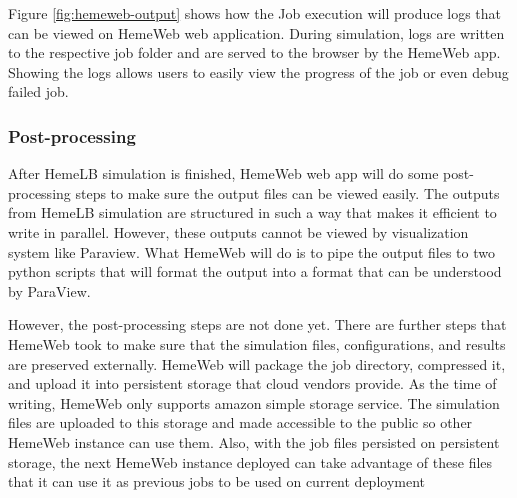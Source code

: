 \vspace{1cm}

\noindent%
\begin{minipage}{\linewidth}%
\label{fig:hemeweb-output}%
\end{minipage}

\vspace{1cm}

Figure \ref{fig:hemeweb-output} shows how the Job execution will produce logs that can be viewed on HemeWeb web application. During simulation, logs are written to the respective job folder and are served to the browser by the HemeWeb app. Showing the logs allows users to easily view the progress of the job or even debug failed job.


\subsubsection{Post-processing}

After HemeLB simulation is finished, HemeWeb web app will do some post-processing steps to make sure the output files can be viewed easily. The outputs from HemeLB simulation are structured in such a way that makes it efficient to write in parallel. However, these outputs cannot be viewed by visualization system like Paraview. What HemeWeb will do is to pipe the output files to two python scripts that will format the output into a format that can be understood by ParaView.


However, the post-processing steps are not done yet. There are further steps that HemeWeb took to make sure that the simulation files, configurations, and results are preserved externally. HemeWeb will package the job directory, compressed it, and upload it into persistent storage that cloud vendors provide. As the time of writing, HemeWeb only supports amazon simple storage service. The simulation files are uploaded to this storage and made accessible to the public so other HemeWeb instance can use them. Also, with the job files persisted on persistent storage, the next HemeWeb instance deployed can take advantage of these files that it can use it as previous jobs to be used on current deployment





